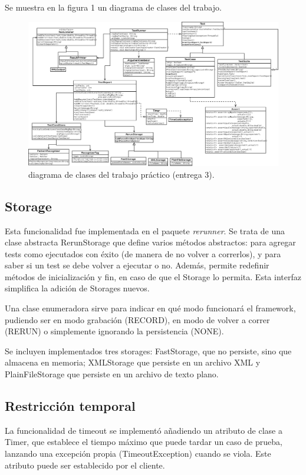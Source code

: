 \documentclass[12pt]{article}
\begin{document}
Se muestra en la figura 1 un diagrama de clases del trabajo.
\begin{figure}[h!]
\begin{center}
	\includegraphics[scale=0.35,angle=90]{./ClassDiagram}
\end{center}
	\caption{diagrama de clases del trabajo práctico (entrega 3).}
\end{figure}

\subsection{Storage}
Esta funcionalidad fue implementada en el paquete \textit{rerunner}. Se trata de una clase
abstracta RerunStorage que define varios métodos abstractos: para agregar tests como 
ejecutados con éxito (de manera de no volver a correrlos), y para saber si un test se debe
volver a ejecutar o no. Además, permite redefinir métodos de inicialización y fin, en caso
de que el Storage lo permita. Esta interfaz simplifica la adición de Storages nuevos.

Una clase enumeradora sirve para indicar en qué modo funcionará el framework, pudiendo ser
en modo grabación (RECORD), en modo de volver a correr (RERUN) o simplemente ignorando la
persistencia (NONE).

Se incluyen implementados tres storages: FastStorage, que no persiste, sino que almacena en
memoria; XMLStorage que persiste en un archivo XML y PlainFileStorage que persiste en un
archivo de texto plano.

\subsection{Restricción temporal}
La funcionalidad de timeout se implementó añadiendo un atributo de clase a Timer, que establece
el tiempo máximo que puede tardar un caso de prueba, lanzando una excepción propia (TimeoutException) 
cuando se viola. 
Este atributo puede ser establecido por el cliente.
\end{document}
